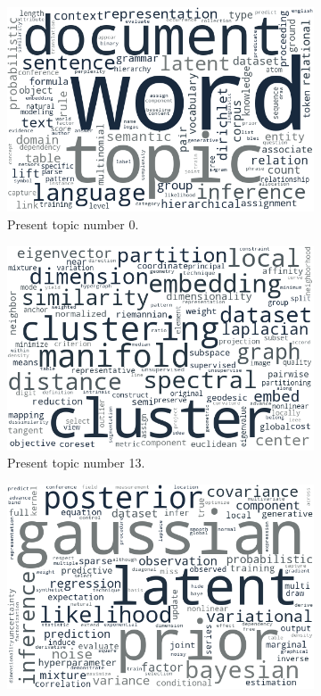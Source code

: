 \clearpage
\begin{figure}[h!]
	\begin{subfigure}{0.49\textwidth}
		\includegraphics[width=\linewidth]{01.Chapters/05.Results/pres_00}
		\caption{Present topic number 0.}
	\end{subfigure}%
	\hfill
	\begin{subfigure}{0.49\textwidth}
		\includegraphics[width=\linewidth]{01.Chapters/05.Results/pres_13}
		\caption{Present topic number 13.}
	\end{subfigure}%
	\vfill
	\begin{subfigure}{0.49\textwidth}
		\includegraphics[width=\linewidth]{01.Chapters/05.Results/pres_16}

\end{subfigure}
\end{figure}
